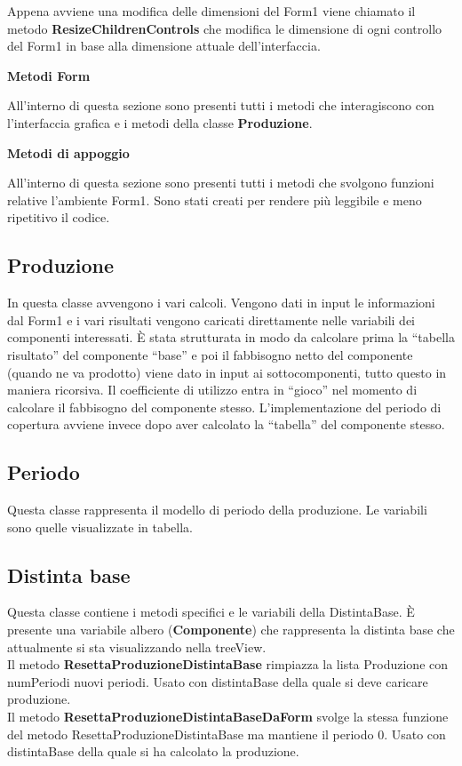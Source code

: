 \documentclass[12pt,twoside]{report}
\begin{document}
Appena avviene una modifica delle dimensioni del Form1 viene chiamato il metodo \textbf{ResizeChildrenControls} che modifica le dimensione di ogni controllo del Form1 in base alla dimensione attuale dell’interfaccia.

\bigskip
\textbf{Metodi Form}

All’interno di questa sezione sono presenti tutti i metodi che interagiscono con l’interfaccia grafica e i metodi della classe \textbf{Produzione}. 

\bigskip
\textbf{Metodi di appoggio}

All’interno di questa sezione sono presenti tutti i metodi che svolgono funzioni relative l’ambiente Form1. Sono stati creati per rendere più leggibile e meno ripetitivo il codice.


\subsection{Produzione}

In questa classe avvengono i vari calcoli. Vengono dati in input le informazioni dal Form1 e i vari risultati vengono caricati direttamente nelle variabili dei componenti interessati. È stata strutturata in modo da calcolare prima la “tabella risultato” del componente “base” e poi il fabbisogno netto del componente (quando ne va prodotto) viene dato in input ai sottocomponenti, tutto questo in maniera ricorsiva.
Il coefficiente di utilizzo entra in “gioco” nel momento di calcolare il fabbisogno del componente stesso. 
L’implementazione del periodo di copertura avviene invece dopo aver calcolato la “tabella” del componente stesso.



\subsection{Periodo}
Questa classe rappresenta il modello di periodo della produzione. Le variabili sono quelle visualizzate in tabella.


\subsection{Distinta base}
Questa classe contiene i metodi specifici e le variabili della DistintaBase. È presente una variabile albero (\textbf{Componente}) che rappresenta la distinta base che attualmente si sta visualizzando nella treeView.\\
Il metodo \textbf{ResettaProduzioneDistintaBase} rimpiazza la lista Produzione con numPeriodi nuovi periodi. Usato con distintaBase della quale si deve caricare produzione.\\
Il metodo \textbf{ResettaProduzioneDistintaBaseDaForm} svolge la stessa funzione del metodo ResettaProduzioneDistintaBase ma mantiene il periodo 0. Usato con distintaBase della quale si ha calcolato la produzione.
\end{document}
